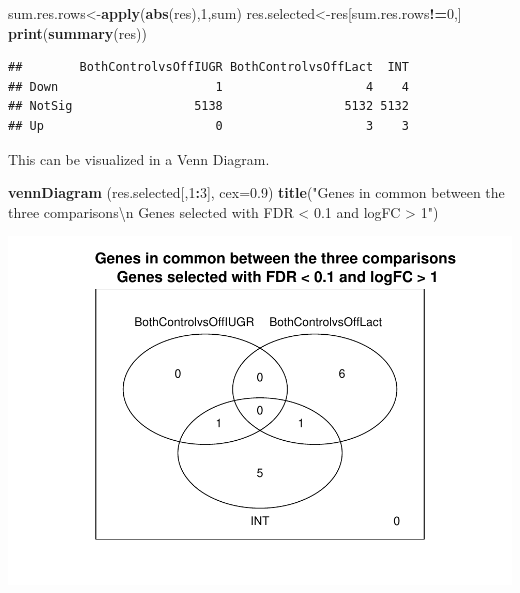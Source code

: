 \documentclass[]{article}
\newenvironment{Shaded}{\begin{snugshade}}{\end{snugshade}}
\newcommand{\KeywordTok}[1]{\textcolor[rgb]{0.13,0.29,0.53}{\textbf{#1}}}
\newcommand{\DataTypeTok}[1]{\textcolor[rgb]{0.13,0.29,0.53}{#1}}
\newcommand{\DecValTok}[1]{\textcolor[rgb]{0.00,0.00,0.81}{#1}}
\newcommand{\FloatTok}[1]{\textcolor[rgb]{0.00,0.00,0.81}{#1}}
\newcommand{\CharTok}[1]{\textcolor[rgb]{0.31,0.60,0.02}{#1}}
\newcommand{\StringTok}[1]{\textcolor[rgb]{0.31,0.60,0.02}{#1}}
\newcommand{\OperatorTok}[1]{\textcolor[rgb]{0.81,0.36,0.00}{\textbf{#1}}}
\newcommand{\NormalTok}[1]{#1}
\begin{document}
\begin{Shaded}
\begin{Highlighting}[]
\NormalTok{sum.res.rows<-}\KeywordTok{apply}\NormalTok{(}\KeywordTok{abs}\NormalTok{(res),}\DecValTok{1}\NormalTok{,sum)}
\NormalTok{res.selected<-res[sum.res.rows}\OperatorTok{!=}\DecValTok{0}\NormalTok{,] }
\KeywordTok{print}\NormalTok{(}\KeywordTok{summary}\NormalTok{(res))}
\end{Highlighting}
\end{Shaded}

\begin{verbatim}
##        BothControlvsOffIUGR BothControlvsOffLact  INT
## Down                      1                    4    4
## NotSig                 5138                 5132 5132
## Up                        0                    3    3
\end{verbatim}

This can be visualized in a Venn Diagram.

\begin{Shaded}
\begin{Highlighting}[]
\KeywordTok{vennDiagram}\NormalTok{ (res.selected[,}\DecValTok{1}\OperatorTok{:}\DecValTok{3}\NormalTok{], }\DataTypeTok{cex=}\FloatTok{0.9}\NormalTok{)}
\KeywordTok{title}\NormalTok{(}\StringTok{"Genes in common between the three comparisons}\CharTok{\textbackslash{}n}\StringTok{ Genes selected with FDR < 0.1 and logFC > 1"}\NormalTok{)}
\end{Highlighting}
\end{Shaded}

\includegraphics{delVal_AnaIsabel_ADO_PEC1_files/figure-latex/unnamed-chunk-51-1.pdf}
\end{document}
